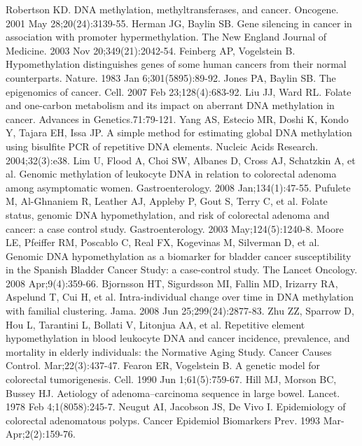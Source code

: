 \begin{thebibliography}{12} 
		Robertson KD. DNA methylation, methyltransferases, and cancer. Oncogene. 2001 May 28;20(24):3139-55. 
		Herman JG, Baylin SB. Gene silencing in cancer in association with promoter hypermethylation. The New England Journal of Medicine. 2003 Nov 20;349(21):2042-54. 
		Feinberg AP, Vogelstein B. Hypomethylation distinguishes genes of some human cancers from their normal counterparts. Nature. 1983 Jan 6;301(5895):89-92. 
		Jones PA, Baylin SB. The epigenomics of cancer. Cell. 2007 Feb 23;128(4):683-92. 
		Liu JJ, Ward RL. Folate and one-carbon metabolism and its impact on aberrant DNA methylation in cancer. Advances in Genetics.71:79-121. 
		Yang AS, Estecio MR, Doshi K, Kondo Y, Tajara EH, Issa JP. A simple method for estimating global DNA methylation using bisulfite PCR of repetitive DNA elements. Nucleic Acids Research. 2004;32(3):e38. 
		Lim U, Flood A, Choi SW, Albanes D, Cross AJ, Schatzkin A, et al. Genomic methylation of leukocyte DNA in relation to colorectal adenoma among asymptomatic women. Gastroenterology. 2008 Jan;134(1):47-55. 
		Pufulete M, Al-Ghnaniem R, Leather AJ, Appleby P, Gout S, Terry C, et al. Folate status, genomic DNA hypomethylation, and risk of colorectal adenoma and cancer: a case control study. Gastroenterology. 2003 May;124(5):1240-8. 
		Moore LE, Pfeiffer RM, Poscablo C, Real FX, Kogevinas M, Silverman D, et al. Genomic DNA hypomethylation as a biomarker for bladder cancer susceptibility in the Spanish Bladder Cancer Study: a case-control study. The Lancet Oncology. 2008 Apr;9(4):359-66. 
		Bjornsson HT, Sigurdsson MI, Fallin MD, Irizarry RA, Aspelund T, Cui H, et al. Intra-individual change over time in DNA methylation with familial clustering. Jama. 2008 Jun 25;299(24):2877-83. 
		Zhu ZZ, Sparrow D, Hou L, Tarantini L, Bollati V, Litonjua AA, et al. Repetitive element hypomethylation in blood leukocyte DNA and cancer incidence, prevalence, and mortality in elderly individuals: the Normative Aging Study. Cancer Causes Control.  Mar;22(3):437-47. 
		Fearon ER, Vogelstein B. A genetic model for colorectal tumorigenesis. Cell. 1990 Jun 1;61(5):759-67. 
		Hill MJ, Morson BC, Bussey HJ. Aetiology of adenoma--carcinoma sequence in large bowel. Lancet. 1978 Feb 4;1(8058):245-7. 
		Neugut AI, Jacobson JS, De Vivo I. Epidemiology of colorectal adenomatous polyps. Cancer Epidemiol Biomarkers Prev. 1993 Mar-Apr;2(2):159-76. 

\end{thebibliography}
